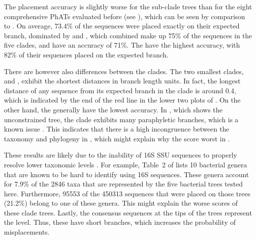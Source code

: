 The placement accuracy is slightly worse for the sub-clade trees
than for the eight comprehensive \acp{PhAT} evaluated before
(see ),
which can be seen by comparison to .
On average, 73.4\% of the sequences were placed exactly on their expected branch,
dominated by  and ,
which combined make up 75\% of the sequences in the five clades, and have an accuracy of 71\%.
The  have the highest accuracy,
with 82\% of their sequences placed on the expected branch.

There are however also differences between the clades.
The two smallest clades,  and ,
exhibit the shortest distances in branch length units.
In fact, the longest distance of any sequence from its expected branch in the  clade
is around \num{0.4}, which is indicated by the end of the red line in the lower two plots of .
On the other hand, the  generally have the lowest accuracy.
In , which shows the unconstrained  tree,
the  clade exhibits many paraphyletic branches,
which is a known issue \citep{Parks2018}.
This indicates that there is a high incongruence
between the  taxonomy and phylogeny in ,
which might explain why the  score worst in .

These results are likely due to the inability of 16S SSU sequences to properly resolve lower taxonomic levels
\citep{Mignard2006,Petti2007,Janda2007}.
For example, Table~2 of \citep{Janda2007} lists \num{10} bacterial genera
that are known to be hard to identify using 16S sequences.
These genera account for \num{7.9}\% of the \num{2846} taxa
that are represented by the five bacterial trees tested here.
Furthermore, \num{95 553} of the \num{450 313} sequences that were placed on those trees (\num{21.2}\%)
belong to one of these genera.
This might explain the worse scores of these clade trees.
Lastly, the consensus sequences at the tips of the trees represent the  level.
Thus, these have short branches, which increases the probability of misplacements.


